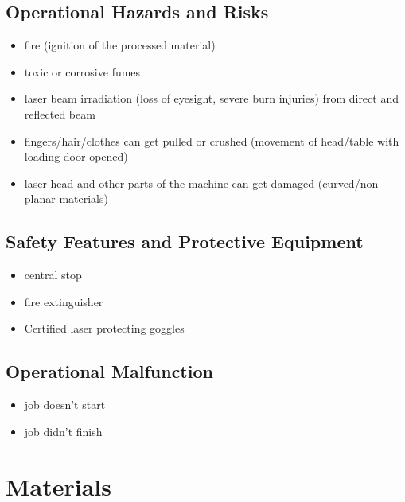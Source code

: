 \documentclass[fleqn]{article}
\begin{document}
\subsection{Operational Hazards and Risks}
	\begin{itemize}[noitemsep,topsep=0pt]
	
		\item fire (ignition of the processed material)
		\item toxic or corrosive fumes
		\item laser beam irradiation (loss of eyesight, severe burn injuries) from direct and reflected beam
		\item fingers/hair/clothes can get pulled or crushed (movement of head/table with loading door opened)
		\item laser head and other parts of the machine can get damaged (curved/non-planar materials)
	
	\end{itemize}

\begin{multicols}{2}\setlength{\parindent}{1em}
	\subsection{Safety Features and Protective Equipment}
	\begin{itemize}[noitemsep,topsep=0pt]
		
		\item central stop
		\item fire extinguisher
		\item Certified laser protecting goggles
		
	\end{itemize}
	\columnbreak
	
	\subsection{Operational Malfunction}
	\begin{itemize}[noitemsep,topsep=0pt]
		
		\item job doesn't start
		\item job didn't finish
		
	\end{itemize}
		\columnbreak
	
\end{multicols}



\clearpage
\section{Materials}
\end{document}
